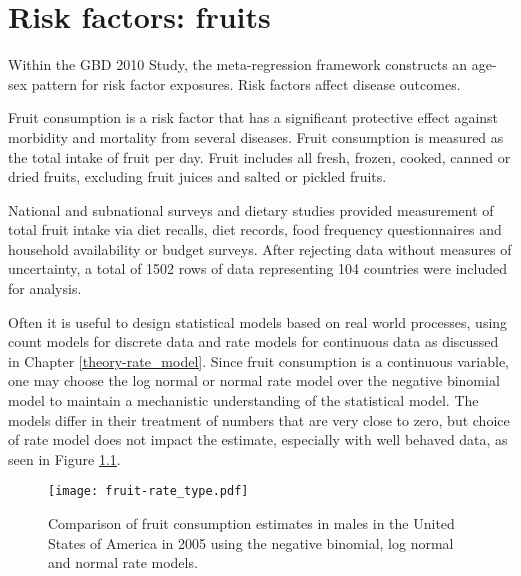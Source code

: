 \chapter{Risk factors: fruits}
\label{applications-log_normal}

Within the GBD 2010 Study, the meta-regression framework constructs an age-sex pattern for risk factor exposures.  Risk factors affect disease outcomes.

Fruit consumption is a risk factor that has a significant protective effect against morbidity and mortality from several diseases.  Fruit consumption is measured as the total intake of fruit per day.  Fruit includes all fresh, frozen, cooked, canned or dried fruits, excluding fruit juices and salted or pickled fruits. \cite{he_increased_2007, boeing_intake_2006}

National and subnational surveys and dietary studies provided measurement of total fruit intake via diet recalls, diet records, food frequency questionnaires and household availability or budget surveys.  After rejecting data without measures of uncertainty, a total of 1502 rows of data representing 104 countries were included for analysis.

Often it is useful to design statistical models based on real world processes, using count models for discrete data and rate models for continuous data as discussed in Chapter \ref{theory-rate_model}.  Since fruit consumption is a continuous variable, one may choose the log normal or normal rate model over the negative binomial model to maintain a mechanistic understanding of the statistical model.  The models differ in their treatment of numbers that are very close to zero, but choice of rate model does not impact the estimate, especially with well behaved data, as seen in Figure \ref{fig:app-fruit rate type}.

    \begin{figure}[h]
        \begin{center}
            \texttt{[image: fruit-rate\_type.pdf]}
            \caption{Comparison of fruit consumption estimates in males in the United States of America in 2005 using the negative binomial, log normal and normal rate models.}
            \label{fig:app-fruit rate type}
        \end{center}
    \end{figure} 